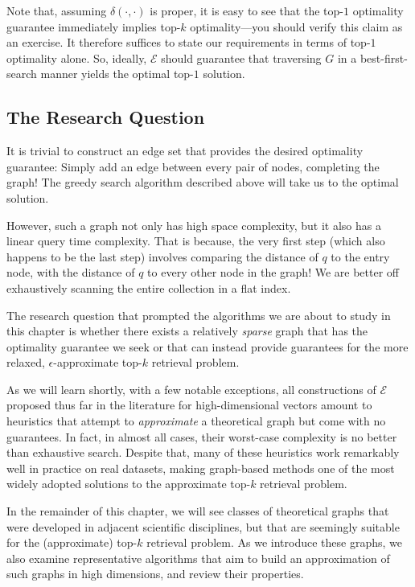 Note that, assuming $\delta(\cdot, \cdot)$ is proper, it is easy to see that
the top-$1$ optimality guarantee immediately implies top-$k$
optimality---you should verify this claim as an exercise.
It therefore suffices to state our requirements in terms of top-$1$ optimality alone.
So, ideally, $\mathcal{E}$ should guarantee that traversing $G$
in a best-first-search manner yields the optimal top-$1$ solution.

\subsection{The Research Question}

It is trivial to construct an edge set that provides the desired optimality guarantee:
Simply add an edge between every pair of nodes, completing the graph!
The greedy search algorithm described above will take us to the optimal solution.

However, such a graph not only has high space complexity, but it also has a linear query time complexity.
That is because, the very first step (which also happens to be the last step)
involves comparing the distance of $q$ to the entry node,
with the distance of $q$ to every other node in the graph! We are better off exhaustively
scanning the entire collection in a flat index.

\begin{svgraybox}
The research question that prompted the algorithms we are about to study in this chapter is
whether there exists a relatively \emph{sparse} graph that has the optimality guarantee we seek
or that can instead provide guarantees for the more relaxed,
$\epsilon$-approximate top-$k$ retrieval problem.
\end{svgraybox}

As we will learn shortly, with a few notable exceptions,
all constructions of $\mathcal{E}$ proposed thus far in the literature 
for high-dimensional vectors amount to
heuristics that attempt to \emph{approximate} a theoretical graph but
come with no guarantees. In fact, in almost all cases,
their worst-case complexity is no better than exhaustive search.
Despite that, many of these heuristics work remarkably well
in practice on real datasets, making graph-based methods one of the most
widely adopted solutions to the approximate top-$k$ retrieval problem.

\smallskip

In the remainder of this chapter, we will see classes of theoretical graphs
that were developed in adjacent scientific disciplines, but that are seemingly suitable
for the (approximate) top-$k$ retrieval problem. As we introduce these graphs,
we also examine representative algorithms that aim to build an approximation
of such graphs in high dimensions, and review their properties.

